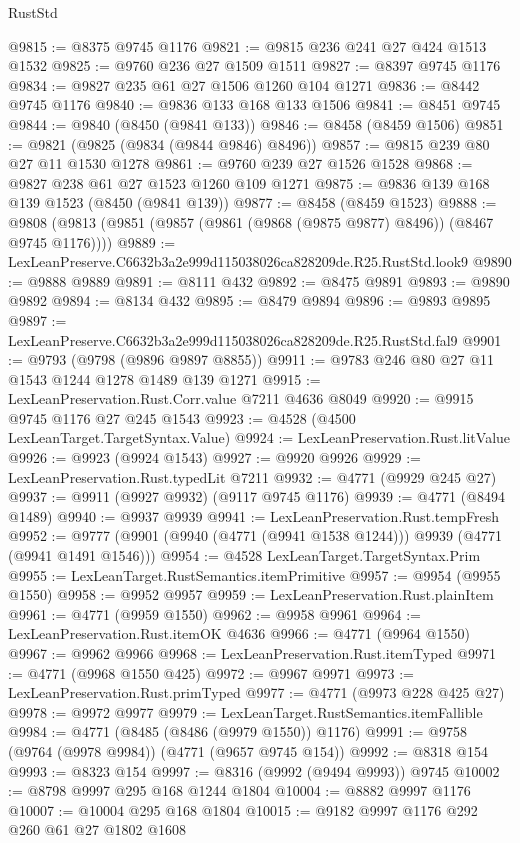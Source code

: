 \begin{lexlean}{RustStd}
\begin{coremodule}
@9815 := @8375 @9745 @1176
@9821 := @9815 @236 @241 @27 @424 @1513 @1532
@9825 := @9760 @236 @27 @1509 @1511
@9827 := @8397 @9745 @1176
@9834 := @9827 @235 @61 @27 @1506 @1260 @104 @1271
@9836 := @8442 @9745 @1176
@9840 := @9836 @133 @168 @133 @1506
@9841 := @8451 @9745
@9844 := @9840 (@8450 (@9841 @133))
@9846 := @8458 (@8459 @1506)
@9851 := @9821 (@9825 (@9834 (@9844 @9846) @8496))
@9857 := @9815 @239 @80 @27 @11 @1530 @1278
@9861 := @9760 @239 @27 @1526 @1528
@9868 := @9827 @238 @61 @27 @1523 @1260 @109 @1271
@9875 := @9836 @139 @168 @139 @1523 (@8450 (@9841 @139))
@9877 := @8458 (@8459 @1523)
@9888 := @9808 (@9813 (@9851 (@9857 (@9861 (@9868 (@9875 @9877) @8496)) (@8467 @9745 @1176))))
@9889 := LexLeanPreserve.C6632b3a2e999d115038026ca828209de.R25.RustStd.look9
@9890 := @9888 @9889
@9891 := @8111 @432
@9892 := @8475 @9891
@9893 := @9890 @9892
@9894 := @8134 @432
@9895 := @8479 @9894
@9896 := @9893 @9895
@9897 := LexLeanPreserve.C6632b3a2e999d115038026ca828209de.R25.RustStd.fal9
@9901 := @9793 (@9798 (@9896 @9897 @8855))
@9911 := @9783 @246 @80 @27 @11 @1543 @1244 @1278 @1489 @139 @1271
@9915 := LexLeanPreservation.Rust.Corr.value @7211 @4636 @8049
@9920 := @9915 @9745 @1176 @27 @245 @1543
@9923 := @4528 (@4500 LexLeanTarget.TargetSyntax.Value)
@9924 := LexLeanPreservation.Rust.litValue
@9926 := @9923 (@9924 @1543)
@9927 := @9920 @9926
@9929 := LexLeanPreservation.Rust.typedLit @7211
@9932 := @4771 (@9929 @245 @27)
@9937 := @9911 (@9927 @9932) (@9117 @9745 @1176)
@9939 := @4771 (@8494 @1489)
@9940 := @9937 @9939
@9941 := LexLeanPreservation.Rust.tempFresh
@9952 := @9777 (@9901 (@9940 (@4771 (@9941 @1538 @1244))) @9939 (@4771 (@9941 @1491 @1546)))
@9954 := @4528 LexLeanTarget.TargetSyntax.Prim
@9955 := LexLeanTarget.RustSemantics.itemPrimitive
@9957 := @9954 (@9955 @1550)
@9958 := @9952 @9957
@9959 := LexLeanPreservation.Rust.plainItem
@9961 := @4771 (@9959 @1550)
@9962 := @9958 @9961
@9964 := LexLeanPreservation.Rust.itemOK @4636
@9966 := @4771 (@9964 @1550)
@9967 := @9962 @9966
@9968 := LexLeanPreservation.Rust.itemTyped
@9971 := @4771 (@9968 @1550 @425)
@9972 := @9967 @9971
@9973 := LexLeanPreservation.Rust.primTyped
@9977 := @4771 (@9973 @228 @425 @27)
@9978 := @9972 @9977
@9979 := LexLeanTarget.RustSemantics.itemFallible
@9984 := @4771 (@8485 (@8486 (@9979 @1550)) @1176)
@9991 := @9758 (@9764 (@9978 @9984)) (@4771 (@9657 @9745 @154))
@9992 := @8318 @154
@9993 := @8323 @154
@9997 := @8316 (@9992 (@9494 @9993)) @9745
@10002 := @8798 @9997 @295 @168 @1244 @1804
@10004 := @8882 @9997 @1176
@10007 := @10004 @295 @168 @1804
@10015 := @9182 @9997 @1176 @292 @260 @61 @27 @1802 @1608

\end{coremodule}
\end{lexlean}
